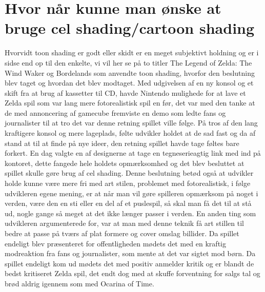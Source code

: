\section{Hvor når kunne man ønske at bruge cel shading/cartoon shading}

Hvorvidt toon shading er godt eller skidt er en meget subjektivt holdning og er i sidse end op til den enkelte, vi vil her se på to titler The Legend of Zelda: The Wind Waker og Bordelands som anvendte toon shading, hvorfor den beslutning blev taget og hvordan det blev modtaget. Med udgivelsen af en ny konsol og et skift fra at brug af kassetter til CD, havde Nintendo mulighede for at lave et Zelda spil som var lang mere fotorealistisk spil en før, det var med den tanke at de med annoncering af gamecube fremviste en demo\cite{ZeldaOnGameCube} som ledte fans og journalister til at tro det var denne retning spillet ville følge. På tros af den lang kraftigere konsol og mere lageplads, følte udvikler holdet at de sad fast og da af stand at til at finde på nye\cite{ZeldaOnGameCube} ideer,  den retning spillet havde tage føltes bare forkert. En dag valgte en af designerne at tage en tegneserieagtig \cite{ToonLinkIsBorn}link med ind på kontoret, dette fangede hele holdets opmærksomhed og det blev besluttet at spillet skulle gøre brug af cel shading. Denne beslutning betød også at udvikler holde kunne være mere fri med art stilen, problemet med fotorealistisk, i følge udvikleren egene mening, er at når man vil gøre spilleren opmærksom på noget i verden, være den en sti eller en del af et puslespil, så skal man få det til at stå ud, nogle gange så meget at det ikke længer passer i verden. En anden ting som udvikleren argumenterede for, var at man med denne teknik få art stillen til bedre at passe på tværs af plat formere og cover omslag \cite{ensArted}billider. Da spillet endeligt blev præsenteret for offentligheden mødets det med en kraftig modreaktion fra fans og journalister, som mente at det var sigtet mod \cite{EtSpilForBørn}børn. Da spillet endeligt kom ud mødets det med positiv \cite{BigScore}anmelder kritik og er blandt de bedst kritiseret Zelda spil, det endt dog med at skuffe forventning for salgs tal og brød aldrig igennem som med Ocarina of Time.
